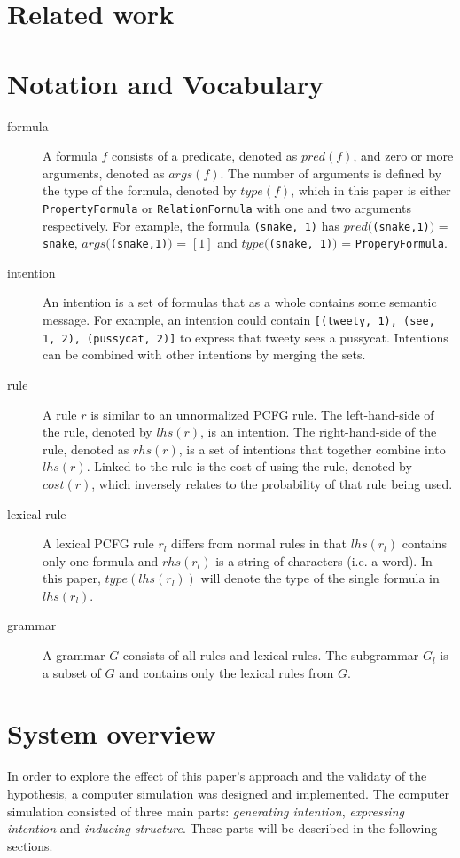 \documentclass[a4paper]{article}
\begin{document}
\section{Related work}
\section{Notation and Vocabulary}
\begin{description}
    \item[formula] A formula $f$ consists of a predicate, denoted as $pred(f)$, and zero or more arguments, denoted as $args(f)$. The number of arguments is defined by the type of the formula, denoted by $type(f)$, which in this paper is either \verb|PropertyFormula| or \verb|RelationFormula| with one and two arguments respectively. For example, the formula \verb|(snake, 1)| has $pred($\verb|(snake,1)|$)$ = \verb|snake|, $args($\verb|(snake,1)|$)$ = $[1]$ and $type($\verb|(snake, 1)|$)$ = \verb|ProperyFormula|.
    \item[intention] An intention is a set of formulas that as a whole contains some semantic message. For example, an intention could contain \verb|[(tweety, 1), (see, 1, 2), (pussycat, 2)]| to express that tweety sees a pussycat. Intentions can be combined with other intentions by merging the sets.
    \item[rule] A rule $r$ is similar to an unnormalized PCFG rule. The left-hand-side of the rule, denoted by $lhs(r)$, is an intention. The right-hand-side of the rule, denoted as $rhs(r)$, is a set of intentions that together combine into $lhs(r)$. Linked to the rule is the cost of using the rule, denoted by $cost(r)$, which inversely relates to the probability of that rule being used.
    \item[lexical rule] A lexical PCFG rule $r_l$ differs from normal rules in that $lhs(r_l)$ contains only one formula and $rhs(r_l)$ is a string of characters (i.e. a word). In this paper, $type(lhs(r_l))$ will denote the type of the single formula in $lhs(r_l)$.
    \item[grammar] A grammar $G$ consists of all rules and lexical rules. The subgrammar $G_l$ is a subset of $G$ and contains only the lexical rules from $G$.
\end{description}
\section{System overview}
\label{sec:system_overview}
In order to explore the effect of this paper's approach and the validaty of the hypothesis, a computer simulation was designed and implemented. The computer simulation consisted of three main parts: \emph{generating intention}, \emph{expressing intention} and \emph{inducing structure}. These parts will be described in the following sections.
\end{document}
